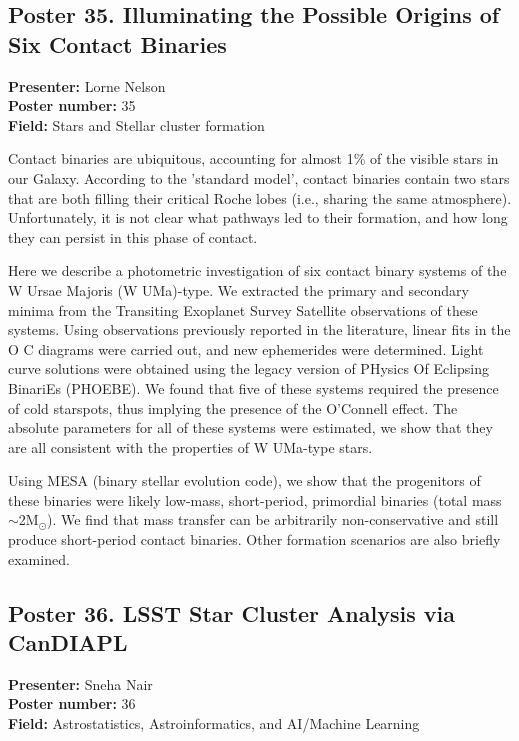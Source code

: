\hypertarget{poster-abstract-talk-166}{}\label{poster-abstract-page-talk-166}
\subsection*{Poster 35. Illuminating the Possible Origins of Six Contact Binaries}
\textbf{Presenter:} Lorne Nelson\\
\textbf{Poster number:} 35\\
\textbf{Field:} Stars and Stellar cluster formation

Contact binaries are ubiquitous, accounting for almost 1\% of the visible stars in our Galaxy. According to the 'standard model', contact binaries contain two stars that are both filling their critical Roche lobes (i.e., sharing the same atmosphere). Unfortunately, it is not clear what pathways led to their formation, and how long they can persist in this phase of contact.

Here we describe a photometric investigation of six contact binary systems of the W Ursae Majoris (W UMa)-type. We extracted the primary and secondary minima from the Transiting Exoplanet Survey Satellite observations of these systems. Using observations previously reported in the literature, linear fits in the O C diagrams were carried out, and new ephemerides were determined. Light curve solutions were obtained using the legacy version of PHysics Of Eclipsing BinariEs (PHOEBE). We found that five of these systems required the presence of cold starspots, thus implying the presence of the O'Connell effect. The absolute parameters for all of these systems were estimated, we show that they are all consistent with the properties of W UMa-type stars.

Using MESA (binary stellar evolution code), we show that the progenitors of these binaries were likely low-mass, short-period, primordial binaries (total mass $\sim$2M$_\odot$). We find that mass transfer can be arbitrarily non-conservative and still produce short-period contact binaries. Other formation scenarios are also briefly examined.

\hypertarget{poster-abstract-talk-213}{}\label{poster-abstract-page-talk-213}
\subsection*{Poster 36. LSST Star Cluster Analysis via CanDIAPL}
\textbf{Presenter:} Sneha Nair\\
\textbf{Poster number:} 36\\
\textbf{Field:} Astrostatistics, Astroinformatics, and AI/Machine Learning

